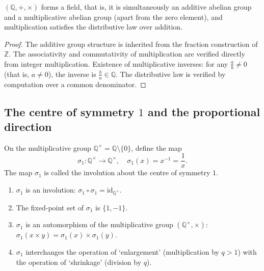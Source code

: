 \begin{proposition}\label{prop:rational_field}
$(\mathbb{Q},+,\times)$ forms a field, that is, it is simultaneously an additive abelian group and a multiplicative abelian group (apart from the zero element), and multiplication satisfies the distributive law over addition.
\end{proposition}

\begin{proof}
The additive group structure is inherited from the fraction construction of $\mathbb{Z}$. The associativity and commutativity of multiplication are verified directly from integer multiplication. Existence of multiplicative inverses: for any $\frac{a}{b} \neq 0$ (that is, $a \neq 0$), the inverse is $\frac{b}{a} \in \mathbb{Q}$. The distributive law is verified by computation over a common denominator.
\end{proof}

\subsection{\texorpdfstring{The centre of symmetry $1$ and the proportional direction}{The centre of symmetry 1 and the proportional direction}}

\begin{definition}\label{def:rational_involution}
On the multiplicative group $\mathbb{Q}^{\times} = \mathbb{Q} \setminus \{0\}$, define the map
\[
\sigma_1: \mathbb{Q}^{\times} \to \mathbb{Q}^{\times}, \quad \sigma_1(x) = x^{-1} = \frac{1}{x}.
\]
The map $\sigma_1$ is called the involution about the centre of symmetry $1$.
\end{definition}

\begin{proposition}\label{prop:rational_involution_properties}
\begin{enumerate}[label=(\roman*)]
    \item $\sigma_1$ is an involution: $\sigma_1 \circ \sigma_1 = \text{id}_{\mathbb{Q}^{\times}}$.
    \item The fixed-point set of $\sigma_1$ is $\{1, -1\}$.
    \item $\sigma_1$ is an automorphism of the multiplicative group $(\mathbb{Q}^{\times}, \times)$: $\sigma_1(x \times y) = \sigma_1(x) \times \sigma_1(y)$.
    \item $\sigma_1$ interchanges the operation of `enlargement' (multiplication by $q>1$) with the operation of `shrinkage' (division by $q$).
\end{enumerate}
\end{proposition}

